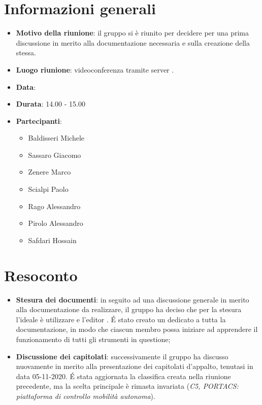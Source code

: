 \section{Informazioni generali}
\begin{itemize}
\item \textbf{Motivo della riunione}: il gruppo si è riunito per decidere per una prima discussione in merito alla documentazione necessaria e sulla creazione della stessa.
\item \textbf{Luogo riunione}: videoconferenza tramite server .
\item \textbf{Data}: \Data{}
\item \textbf{Durata}: 14.00 - 15.00
\item \textbf{Partecipanti}:
	\begin{itemize}
	\item Baldisseri Michele
	\item Sassaro Giacomo
	\item Zenere Marco
	\item Scialpi Paolo
	\item Rago Alessandro
	\item Pirolo Alessandro
	\item Safdari Hossain
	\end{itemize}
\end{itemize}
\newpage
\section{Resoconto}
\begin{itemize}
\item \textbf{Stesura dei documenti}: in seguito ad una discussione generale in merito alla documentazione da realizzare, il gruppo ha deciso che per la stesura l'ideale è utilizzare  e l'editor . \'E stato creato un  dedicato a tutta la documentazione, in modo che ciascun membro possa iniziare ad apprendere il funzionamento di tutti gli strumenti in questione;

\item \textbf{Discussione dei capitolati}: successivamente il gruppo ha discusso nuovamente in merito alla presentazione dei capitolati d'appalto, tenutasi in data 05-11-2020. \'E stata aggiornata la classifica creata nella riunione precedente, ma la scelta principale è rimasta invariata (\textit{C5, PORTACS: piattaforma di controllo mobilità autonoma}).
\end{itemize}